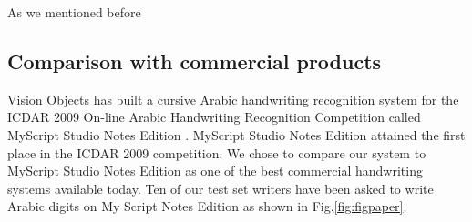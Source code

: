 \documentclass[times, 10pt,twocolumn]{article}
\begin{document}
%




As we mentioned before 
\subsection{Comparison with commercial products}




Vision Objects has built a cursive Arabic handwriting recognition system for the ICDAR 2009 On-line Arabic Handwriting Recognition Competition\cite{ICDAR2009} called MyScript Studio Notes Edition \cite{MyScript}. MyScript Studio Notes Edition attained the first place in the ICDAR 2009 competition. We chose to compare our system to MyScript Studio Notes Edition as one of the best commercial handwriting systems available today. Ten of our test set writers have been asked to write Arabic digits on My Script Notes Edition as shown in Fig.\ref{fig:figpaper}.
\end{document}
